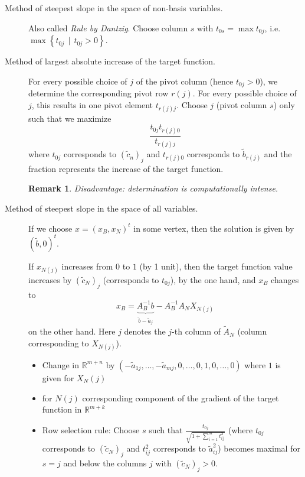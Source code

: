 \documentclass{article}
\numberwithin{lecref}{section}
\newtheorem*{Remark}{Remark}
\newcommand{\SetDef}[2]{\left\{#1\,\mid\,#2\right\}}
\begin{document}
\begin{description}
	\item[Method of steepest slope in the space of non-basis variables.]
		Also called \emph{Rule by Dantzig}.
		Choose column $s$ with $t_{0s} = \max t_{0j}$, i.e. $\max\SetDef{t_{0j}}{t_{0j} > 0}$.
	\item[Method of largest absolute increase of the target function.]
		For every possible choice of $j$ of the pivot column (hence $t_{0j} > 0$), we determine the corresponding pivot row $r(j)$.
		For every possible choice of $j$, this results in one pivot element $t_{r(j)j}$.
		Choose $j$ (pivot column $s$) only such that we maximize
		\[ \frac{t_{0j} t_{r(j)0}}{t_{r(j)j}} \]
		where $t_{0j}$ corresponds to $(\tilde c_n)_j$ and $t_{r(j)0}$ corresponds to $\tilde b_{r(j)}$
		and the fraction represents the increase of the target function.
		\begin{Remark} Disadvantage: determination is computationally intense. \end{Remark}
	\item[Method of steepest slope in the space of all variables.]
		If we choose $x = (x_B, x_N)^t$ in some vertex, then the solution is given by $(\tilde b, 0)^t$.

		If $x_{N(j)}$ increases from $0$ to $1$ (by 1 unit), then the target function value increases by $(\tilde c_N)_j$ (corresponds to $t_{0j}$), by the one hand, and $x_B$ changes to
		\[ x_B = \underbrace{A_B^{-1} b}_{\tilde b - \tilde a_j} - A_B^{-1} A_N X_{N(j)} \]
		on the other hand. Here $j$ denotes the $j$-th column of $\tilde A_N$ (column corresponding to $X_{N(j)}$).

		\begin{itemize}
			\item Change in $\mathbb R^{m+n}$ by $(-\tilde a_{1j}, \dots, -\tilde a_{mj}, 0, \dots, 0, 1, 0, \dots, 0)$ where $1$ is given for $X_N(j)$
			\item for $N(j)$ corresponding component of the gradient of the target function in $\mathbb R^{m+k}$
			\item Row selection rule: Choose $s$ such that $\frac{t_{0j}}{\sqrt{1 + \sum_{i=1}^m t_{ij}^2}}$ (where $t_{0j}$ corresponds to $(\tilde c_N)_j$ and $t_{ij}^2$ corresponds to $\tilde a_{ij}^2$) becomes maximal for $s = j$ and below the columns $j$ with $(\tilde c_N)_j > 0$.
		\end{itemize}
\end{description}


\printindex
\end{document}
